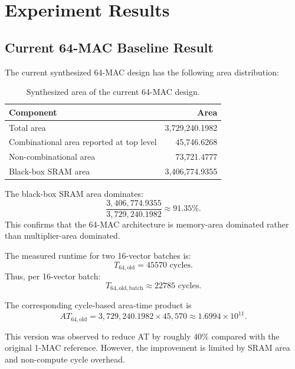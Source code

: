 \documentclass[11pt,a4paper]{article}
\begin{document}
\section{Experiment Results}

\subsection{Current 64-MAC Baseline Result}

The current synthesized 64-MAC design has the following area distribution:

\begin{table}[H]
\centering
\caption{Synthesized area of the current 64-MAC design.}
\begin{tabular}{lr}
\toprule
Component & Area \\
\midrule
Total area & 3,729,240.1982 \\
Combinational area reported at top level & 45,746.6268 \\
Non-combinational area & 73,721.4777 \\
Black-box SRAM area & 3,406,774.9355 \\
\bottomrule
\end{tabular}
\end{table}

The black-box SRAM area dominates:
\begin{equation}
    \frac{3,406,774.9355}{3,729,240.1982} \approx 91.35\%.
\end{equation}
This confirms that the 64-MAC architecture is memory-area dominated rather than multiplier-area dominated.

The measured runtime for two 16-vector batches is:
\begin{equation}
    T_{64,\mathrm{old}} = 45570 \text{ cycles}.
\end{equation}
Thus, per 16-vector batch:
\begin{equation}
    T_{64,\mathrm{old,batch}} \approx 22785 \text{ cycles}.
\end{equation}

The corresponding cycle-based area-time product is
\begin{equation}
    AT_{64,\mathrm{old}} = 3,729,240.1982 \times 45,570
    \approx 1.6994 \times 10^{11}.
\end{equation}

This version was observed to reduce AT by roughly 40\% compared with the original 1-MAC reference. However, the improvement is limited by SRAM area and non-compute cycle overhead.
\end{document}

